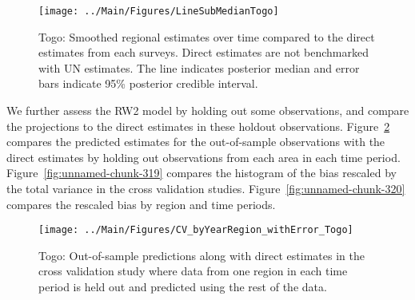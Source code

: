\documentclass[12pt]{article}\usepackage[]{graphicx}\usepackage[]{color}
\newenvironment{knitrout}{}{} %
\begin{document}
\begin{knitrout}
\color{fgcolor}\begin{figure}[bht]

{\centering \texttt{[image: ../Main/Figures/LineSubMedianTogo]} 

}

\caption[Togo]{Togo: Smoothed regional estimates over time compared to the direct estimates from each surveys. Direct estimates are not benchmarked with UN estimates. The line indicates posterior median and error bars indicate 95\% posterior credible interval.}\label{fig:unnamed-chunk-317}
\end{figure}


\end{knitrout}
We further assess the RW2 model by holding out some observations, and compare the projections to the direct estimates in these holdout observations. Figure~\ref{fig:unnamed-chunk-318} compares the predicted estimates for the out-of-sample observations  with the direct estimates by holding out observations from each area in each time period.  Figure~\ref{fig:unnamed-chunk-319} compares the histogram of the bias rescaled by the total variance in the cross validation studies. Figure~\ref{fig:unnamed-chunk-320} compares the rescaled bias by region and time periods.



 
\begin{knitrout}
\color{fgcolor}\begin{figure}[bht]

{\centering \texttt{[image: ../Main/Figures/CV\_byYearRegion\_withError\_Togo]} 

}

\caption[Togo]{Togo: Out-of-sample predictions along with direct estimates in the cross validation study where data from one region in each time period is held out and predicted using the rest of the data.}\label{fig:unnamed-chunk-318}
\end{figure}


\end{knitrout}
\end{document}
